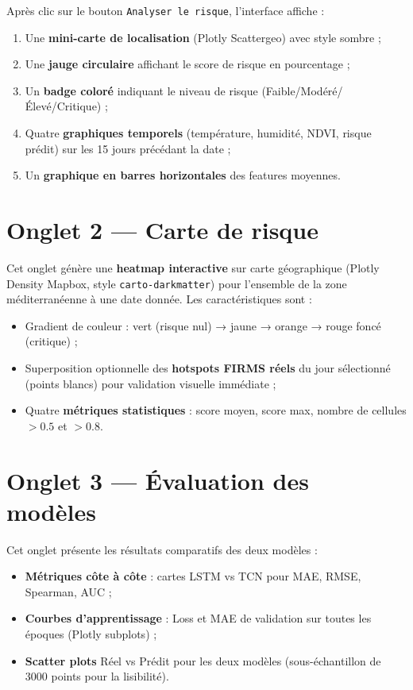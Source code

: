 \documentclass[12pt,a4paper]{report}
\begin{document}
Après clic sur le bouton \texttt{Analyser le risque}, l'interface affiche :
\begin{enumerate}[leftmargin=*]
  \item Une \textbf{mini-carte de localisation} (Plotly Scattergeo) avec style sombre ;
  \item Une \textbf{jauge circulaire} affichant le score de risque en pourcentage ;
  \item Un \textbf{badge coloré} indiquant le niveau de risque (Faible/Modéré/Élevé/Critique) ;
  \item Quatre \textbf{graphiques temporels} (température, humidité, NDVI, risque prédit)
        sur les 15 jours précédant la date ;
  \item Un \textbf{graphique en barres horizontales} des features moyennes.
\end{enumerate}

\section{Onglet 2 — Carte de risque}

Cet onglet génère une \textbf{heatmap interactive} sur carte géographique (Plotly
Density Mapbox, style \texttt{carto-darkmatter}) pour l'ensemble de la zone
méditerranéenne à une date donnée. Les caractéristiques sont :
\begin{itemize}[leftmargin=*]
  \item Gradient de couleur : vert (risque nul) → jaune → orange → rouge foncé (critique) ;
  \item Superposition optionnelle des \textbf{hotspots FIRMS réels} du jour sélectionné
        (points blancs) pour validation visuelle immédiate ;
  \item Quatre \textbf{métriques statistiques} : score moyen, score max, nombre de
        cellules $> 0.5$ et $> 0.8$.
\end{itemize}

\section{Onglet 3 — Évaluation des modèles}

Cet onglet présente les résultats comparatifs des deux modèles :
\begin{itemize}[leftmargin=*]
  \item \textbf{Métriques côte à côte} : cartes LSTM vs TCN pour MAE, RMSE, Spearman, AUC ;
  \item \textbf{Courbes d'apprentissage} : Loss et MAE de validation sur toutes les
        époques (Plotly subplots) ;
  \item \textbf{Scatter plots} Réel vs Prédit pour les deux modèles (sous-échantillon
        de 3000 points pour la lisibilité).
\end{itemize}
\end{document}
